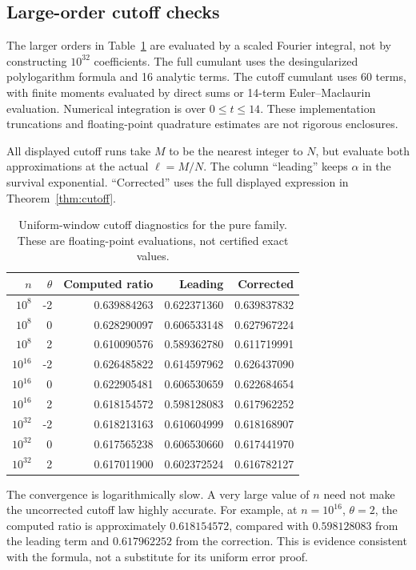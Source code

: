 \documentclass[11pt,a4paper]{article}
\numberwithin{equation}{section}
\theoremstyle{definition}
\theoremstyle{remark}
\begin{document}
\subsection{Large-order cutoff checks}
The larger orders in Table~\ref{tab:large} are evaluated by a scaled Fourier
integral, not by constructing \(10^{32}\) coefficients. The full cumulant uses
the desingularized polylogarithm formula and 16 analytic terms. The cutoff
cumulant uses 60 terms, with finite moments evaluated by direct sums or
14-term Euler--Maclaurin evaluation. Numerical integration is over
\(0\le t\le14\). These implementation truncations and floating-point
quadrature estimates are not rigorous enclosures.

All displayed cutoff runs take \(M\) to be the nearest integer to \(N\),
but evaluate both approximations at the actual \(\ell=M/N\). The column
``leading'' keeps \(\alpha\) in the survival exponential. ``Corrected''
uses the full displayed expression in Theorem~\ref{thm:cutoff}.

\begin{table}[htbp]
\centering\small
\begin{tabular}{rrrrr}
\toprule
$n$ & $\theta$ & Computed ratio & Leading & Corrected\\
\midrule
$10^{8}$ & -2 & 0.639884263 & 0.622371360 & 0.639837832\\
$10^{8}$ & 0 & 0.628290097 & 0.606533148 & 0.627967224\\
$10^{8}$ & 2 & 0.610090576 & 0.589362780 & 0.611719991\\
$10^{16}$ & -2 & 0.626485822 & 0.614597962 & 0.626437090\\
$10^{16}$ & 0 & 0.622905481 & 0.606530659 & 0.622684654\\
$10^{16}$ & 2 & 0.618154572 & 0.598128083 & 0.617962252\\
$10^{32}$ & -2 & 0.618213163 & 0.610604999 & 0.618168907\\
$10^{32}$ & 0 & 0.617565238 & 0.606530660 & 0.617441970\\
$10^{32}$ & 2 & 0.617011900 & 0.602372524 & 0.616782127\\
\bottomrule
\end{tabular}
\caption{Uniform-window cutoff diagnostics for the pure family. These are
floating-point evaluations, not certified exact values.}
\label{tab:large}
\end{table}

The convergence is logarithmically slow. A very large value of \(n\) need not
make the uncorrected cutoff law highly accurate. For example, at
\(n=10^{16}\), \(\theta=2\), the computed ratio is approximately
\(0.618154572\), compared with \(0.598128083\) from the leading term and
\(0.617962252\) from the correction. This is evidence consistent with the
formula, not a substitute for its uniform error proof.
\end{document}
